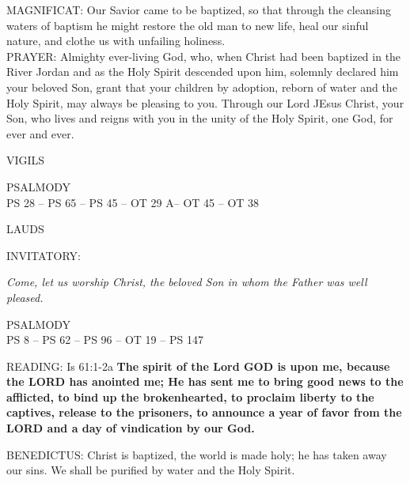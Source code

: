\noindent\small{\uppercase{MAGNIFICAT:}}	Our Savior came to be baptized, so that through the cleansing waters of baptism he might restore the old man to new life, heal our sinful nature, and clothe us with unfailing holiness.\\

\noindent\small{\uppercase{PRAYER:}}	Almighty ever-living God, who, when Christ had been baptized in the River Jordan and as the Holy Spirit descended upon him, solemnly declared him your beloved Son, grant that your children by adoption, reborn of water and the Holy Spirit, may always be pleasing to you. Through our Lord JEsus Christ, your Son, who lives and reigns with you in the unity of the Holy Spirit, one God, for ever and ever.

\begin{flushleft}\normalsize{\uppercase{VIGILS\\}}\end{flushleft}
\noindent\small{\uppercase{PSALMODY}\\} 
\uppercase{Ps 28 -- Ps 65 -- Ps 45 -- OT 29 A-- OT 45 -- OT 38}\vspace{0.5em}\\

\begin{flushleft}\normalsize{\uppercase{LAUDS\\}}\end{flushleft}
\small{\uppercase{INVITATORY:}}\normalsize
\begin{center}
\textit{Come, let us worship Christ, the beloved Son in whom the Father was well pleased.\\}
\end{center}
\noindent\small{\uppercase{PSALMODY}\\}
\uppercase{Ps 8 -- Ps 62 -- Ps 96 -- OT 19 -- Ps 147}\vspace{0.5em}

\noindent\small{\uppercase {READING:}}   Is 61:1-2a  \textbf{The spirit of the Lord GOD is upon me, because the LORD has anointed me; He has sent me to bring good news to the afflicted, to bind up the brokenhearted, to proclaim liberty to the captives, release to the prisoners, to announce a year of favor from the LORD and a day of vindication by our God.\\}

\noindent\small{\uppercase{BENEDICTUS:}}	Christ is baptized, the world is made holy; he has taken away our sins. We shall be purified by water and the Holy Spirit.\\


